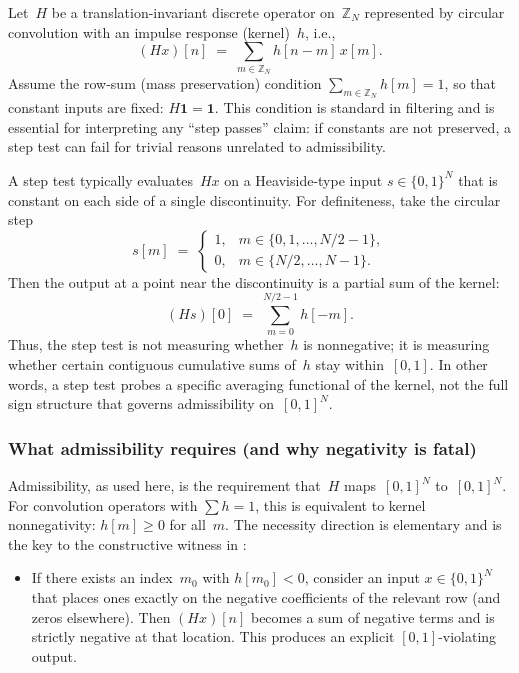 \documentclass[11pt,a4paper]{article}
\theoremstyle{plain}
\theoremstyle{definition}
\theoremstyle{plain}
\newcommand{\Z}{\mathbb{Z}}
\newcommand{\one}{\mathbf{1}}
\begin{document}
Let~$H$ be a translation-invariant discrete operator on~$\Z_N$ represented by
circular convolution with an impulse response (kernel)~$h$, i.e.,
\[
  (Hx)[n]
  \;=\;
  \sum_{m \in \Z_N} h[n-m]\,x[m].
\]
Assume the row-sum (mass preservation) condition $\sum_{m \in \Z_N} h[m] = 1$,
so that constant inputs are fixed: $H\one = \one$.  This condition is standard in
filtering and is essential for interpreting any ``step passes'' claim: if
constants are not preserved, a step test can fail for trivial reasons unrelated
to admissibility.

A step test typically evaluates~$Hx$ on a Heaviside-type input
$s \in \{0,1\}^N$ that is constant on each side of a single discontinuity.  For
definiteness, take the circular step
\[
  s[m] \;=\;
  \begin{cases}
    1, & m \in \{0,1,\dots,N/2-1\},\\
    0, & m \in \{N/2,\dots,N-1\}.
  \end{cases}
\]
Then the output at a point near the discontinuity is a partial sum of the kernel:
\[
  (Hs)[0] \;=\; \sum_{m=0}^{N/2-1} h[-m].
\]
Thus, the step test is not measuring whether~$h$ is nonnegative; it is measuring
whether certain contiguous cumulative sums of~$h$ stay within~$[0,1]$.  In other
words, a step test probes a specific averaging functional of the kernel, not the
full sign structure that governs admissibility on~$[0,1]^N$.


\subsubsection{What admissibility requires (and why negativity is fatal)}

Admissibility, as used here, is the requirement that~$H$ maps~$[0,1]^N$
to~$[0,1]^N$.  For convolution operators with $\sum h = 1$, this is equivalent
to kernel nonnegativity: $h[m] \ge 0$ for all~$m$.  The necessity direction is
elementary and is the key to the constructive witness in :

\begin{itemize}[leftmargin=2em]
  \item If there exists an index~$m_0$ with $h[m_0] < 0$, consider an input
    $x \in \{0,1\}^N$ that places ones exactly on the negative coefficients of
    the relevant row (and zeros elsewhere).  Then $(Hx)[n]$ becomes a sum of
    negative terms and is strictly negative at that location.  This produces an
    explicit $[0,1]$-violating output.
\end{itemize}
\end{document}
